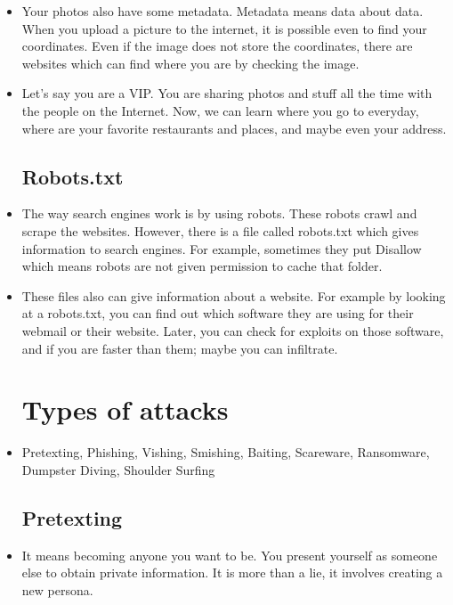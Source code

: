 \documentclass[12pt]{article}
\newcommand{\red}[1]{{\color{red} #1}}
\begin{document}
\begin{itemize}[itemsep=3em]
	\item Your photos also have some metadata. Metadata means data about data. When you upload a picture to the internet, it is possible even to find your coordinates. Even if the image does not store the coordinates, there are websites which can find where you are by checking the image. 
	
	\item Let's say you are a VIP. You are sharing photos and stuff all the time with the people on the Internet. Now, we can learn where you go to everyday, where are your favorite restaurants and places, and maybe even your address.


	
	\subsection{Robots.txt}
	
	\item The way search engines work is by using robots. These robots crawl and scrape the websites. However, there is a file called robots.txt which gives information to search engines. For example, sometimes they put \red{Disallow} which means robots are not given permission to cache that folder.
	
	\item These files also can give information about a website. For example by looking at a robots.txt, you can find out which software they are using for their webmail or their website. Later, you can check for exploits on those software, and if you are faster than them; maybe you can infiltrate.
	

	
	\newpage
	\section{Types of attacks}
	
	\item Pretexting, Phishing, Vishing, Smishing, Baiting, Scareware, Ransomware, Dumpster Diving, Shoulder Surfing
	
	\subsection{Pretexting}
	
	\item It means becoming anyone you want to be. You present yourself as someone else to obtain private information. It is more than a lie, it involves creating a new persona. 
	

\end{itemize}
\end{document}
